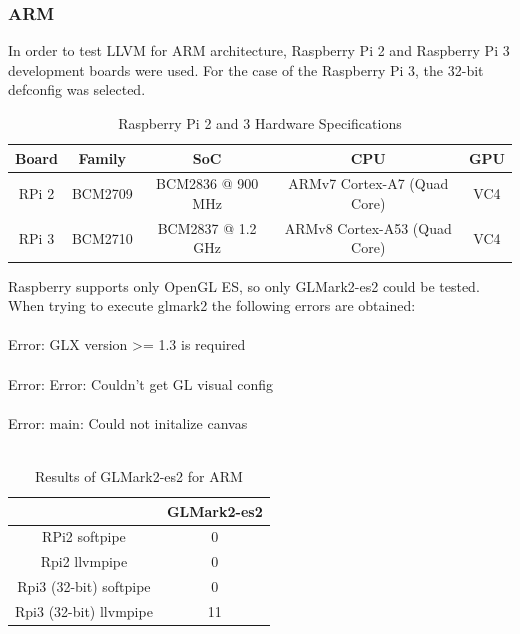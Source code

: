 \documentclass[12pt,a4paper,oneside]{article}
\begin{document}
\subsubsection*{ARM}
In order to test LLVM for ARM architecture, Raspberry Pi 2 and Raspberry Pi 3
development boards were used. For the case of the Raspberry Pi 3, the 32-bit
defconfig was selected.

\begin{table}[h!]
  \begin{center}
    \caption{Raspberry Pi 2 and 3 Hardware Specifications}
    \label{tab:rpi_specs}
    \begin{tabular}{c c c c c }
    Board & Family & SoC & CPU & GPU \\
    \hline
    RPi 2 & BCM2709 & BCM2836 @ 900 MHz & ARMv7 Cortex-A7 (Quad Core) & VC4 \\
    RPi 3 & BCM2710 & BCM2837 @ 1.2 GHz & ARMv8 Cortex-A53 (Quad Core) & VC4 \\
    \end{tabular}
  \end{center}
\end{table}

Raspberry supports only OpenGL ES, so only GLMark2-es2 could be tested. When
trying to execute {\selectfont glmark2} the following errors are
obtained:\\\\
{\selectfont Error: GLX version >= 1.3 is required}\\\\
{\selectfont Error: Error: Couldn't get GL visual config}\\\\
{\selectfont Error: main: Could not initalize canvas}\\\\


\begin{table}[h!]
  \begin{center}
    \caption{Results of GLMark2-es2 for ARM}
    \label{tab:glmark2_ARM}
    \begin{tabular}{c|c}
    & {GLMark2-es2} \\
    \hline
    RPi2 softpipe & 0\\
    Rpi2 llvmpipe & 0\\
    Rpi3 (32-bit) softpipe & 0\\
    Rpi3 (32-bit) llvmpipe & 11\\
    \end{tabular}
  \end{center}
\end{table}
\end{document}
